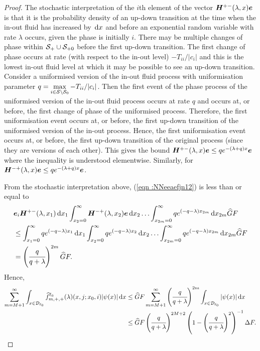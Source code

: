 \begin{proof}
	The stochastic interpretation of the \(i\)th element of the vector \(\boldsymbol H^{+-}(\lambda,x)\boldsymbol e\) is that it is the probability density of an up-down transition at the time when the in-out fluid has increased by \(\, \mathrm{d} x\) and before an exponential random variable with rate \(\lambda\) occurs, given the phase is initially \(i\). There may be multiple changes of phase within \(\mathcal S_+\cup\mathcal{S}_{+0}\) before the first up-down transition. The first change of phase occurs at rate (with respect to the in-out level) \(-T_{ii}/|c_i|\) and this is the lowest in-out fluid level at which it may be possible to see an up-down transition. Consider a uniformised version of the in-out fluid process with uniformisation parameter \(q = \max\limits_{i\in\mathcal S\setminus \mathcal{S}_0}-T_{ii}/|c_i|\). Then the first event of the phase process of the uniformised version of the in-out fluid process occurs at rate \(q\) and occurs at, or before, the first change of phase of the uniformised process. Therefore, the first uniformisation event occurs at, or before, the first up-down transition of the uniformised version of the in-out process. Hence, the first uniformisation event occurs at, or before, the first up-down transition of the original process (since they are versions of each other). This gives the bound \(\boldsymbol H^{+-}(\lambda,x)\boldsymbol e\leq qe^{-(\lambda + q)x}\boldsymbol e\) where the inequality is understood elementwise.	Similarly, for \(\boldsymbol H^{-+}(\lambda,x)\boldsymbol e\leq qe^{-(\lambda + q)x}\boldsymbol e\).
	
	From the stochastic interpretation above, (\ref{eqn :NNeeaefjn12}) is less than or equal to 
	\begin{align}
	&\boldsymbol e_i \boldsymbol H^{+-}(\lambda,x_1) \, \mathrm{d} x_1 \int_{x_2=0}^\infty \boldsymbol H^{-+}(\lambda,x_2) \boldsymbol e \, \mathrm{d} x_2  
				\hdots \int_{x_{2m}=0}^\infty qe^{(-q-\lambda)x_{2m}}\, \mathrm{d} x_{2m}\widehat GF\nonumber
	\\&\leq \int_{x_1=0}^\infty qe^{(-q-\lambda)x_1}  \, \mathrm{d} x_1 \int_{x_2=0}^\infty qe^{(-q-\lambda)x_2}  \, \mathrm{d} x_2  
				\hdots \int_{x_{2m}=0}^\infty qe^{(-q-\lambda)x_{2m}}\, \mathrm{d} x_{2m}\widehat GF \nonumber
	\\&= \left(\cfrac{q}{q+\lambda}\right)^{2m}\widehat GF.\label{eqn: bound ggggaaaa}
	\end{align}
	Hence,  
	\begin{align}
		\sum_{m=M+1}^\infty \int_{x\in\mathcal{D}_{\ell_0}} \widehat f^{\ell_0}_{m,+,+}(\lambda)(x,j;x_0,i)|\psi(x)|\, \mathrm{d} x \nonumber
		&\leq  \widehat GF  \sum_{m=M+1}^\infty \left(\cfrac{q}{q+\lambda}\right)^{2m}\int_{x\in\mathcal{D}_{\ell_0}} |\psi(x)|\, \mathrm{d} x \nonumber
		\\&\leq \widehat GF \left(\cfrac{q}{q+\lambda}\right)^{2M+2} \left(1-\left(\cfrac{q}{q+\lambda}\right)^2\right)^{-1} \Delta F.
	\end{align}
	

\end{proof}
